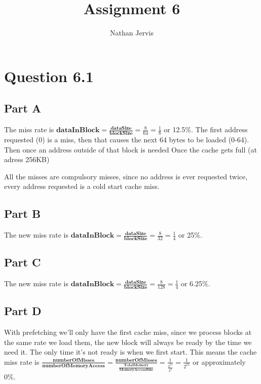 \documentclass[11pt]{article} %
\title{Assignment 6}
\author{Nathan Jervis}
\begin{document}
\maketitle

\section{Question 6.1}

\subsection{Part A}

The miss rate is $\textbf{dataInBlock} = \frac{\textbf{dataSize}}{\textbf{blockSize}} = \frac{8}{64} = \frac{1}{8}$ or 12.5\%. The first address requested (0) is a miss, then that causes the next 64 bytes to be loaded (0-64). Then once an address outside of that block is needed Once the cache gets full (at adress 256KB)

All the misses are compulsory misses, since no address is ever requested twice, every address requested is a cold start cache miss.

\subsection{Part B}

The new miss rate is $\textbf{dataInBlock} = \frac{\textbf{dataSize}}{\textbf{blockSize}} = \frac{8}{32} = \frac{1}{4}$ or 25\%.

\subsection{Part C}

The new miss rate is $\textbf{dataInBlock} = \frac{\textbf{dataSize}}{\textbf{blockSize}} = \frac{8}{128} = \frac{1}{4}$ or 6.25\%.

\subsection{Part D}

With prefetching we'll only have the first cache miss, since we process blocks at the same rate we load them, the new block will always be ready by the time we need it. The only time it's not ready is when we first start. This means the cache miss rate is $\frac{\textbf{numberOfMisses}}{\textbf{numberOfMemoryAccess}} = \frac{\textbf{numberOfMisses}}{\frac{\textbf{TotalMemory}}{\textbf{MemoryAccessSize}}} = \frac{1}{\frac{2^{24}}{2^{3}}} = \frac{1}{2^{21}}$ or approximately 0\%.
\end{document}
